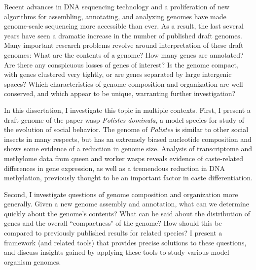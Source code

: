 
Recent advances in DNA sequencing technology and a proliferation of new algorithms for assembling, annotating, and analyzing genomes have made genome-scale sequencing more accessible than ever.
As a result, the last several years have seen a dramatic increase in the number of published draft genomes.
Many important research problems revolve around interpretation of these draft genomes:
What are the contents of a genome?
How many genes are annotated?
Are there any conspicuous losses of genes of interest?
Is the genome compact, with genes clustered very tightly, or are genes separated by large intergenic spaces?
Which characteristics of genome composition and organization are well conserved, and which appear to be unique, warranting further investigation?

In this dissertation, I investigate this topic in multiple contexts.
First, I present a draft genome of the paper wasp \textit{Polistes dominula}, a model species for study of the evolution of social behavior.
The genome of \textit{Polistes} is similar to other social insects in many respects, but has an extremely biased nucleotide composition and shows some evidence of a reduction in genome size.
Analysis of transcriptome and methylome data from queen and worker wasps reveals evidence of caste-related differences in gene expression, as well as a tremendous reduction in DNA methylation, previously thought to be an important factor in caste differentiation.

Second, I investigate questions of genome composition and organization more generally.
Given a new genome assembly and annotation, what can we determine quickly about the genome's contents?
What can be said about the distribution of genes and the overall ``compactness" of the genome?
How should this be compared to previously published results for related species?
I present a framework (and related tools) that provides precise solutions to these questions, and discuss insights gained by applying these tools to study various model organism genomes.
